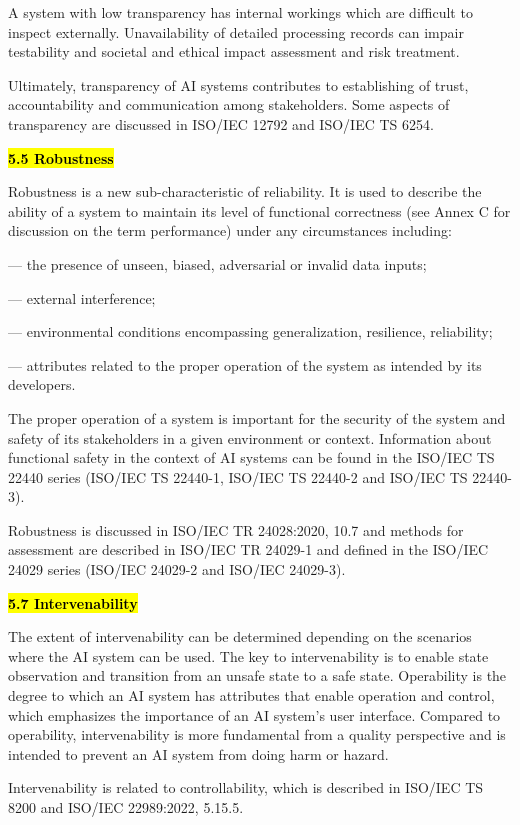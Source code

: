 \documentclass[
  letterpaper,
  DIV=11,
  numbers=noendperiod,
  oneside]{scrreprt}
\begin{document}
\begin{tcolorbox}
A system with low transparency has internal workings which are difficult
to inspect externally. Unavailability of detailed processing records can
impair testability and societal and ethical impact assessment and risk
treatment.

Ultimately, transparency of AI systems contributes to establishing of
trust, accountability and communication among stakeholders. Some aspects
of transparency are discussed in ISO/IEC 12792 and ISO/IEC TS 6254.

\textbf{\hl{5.5 Robustness}}

Robustness is a new sub-characteristic of reliability. It is used to
describe the ability of a system to maintain its level of functional
correctness (see Annex C for discussion on the term performance) under
any circumstances including:

--- the presence of unseen, biased, adversarial or invalid data inputs;

--- external interference;

--- environmental conditions encompassing generalization, resilience,
reliability;

--- attributes related to the proper operation of the system as intended
by its developers.

The proper operation of a system is important for the security of the
system and safety of its stakeholders in a given environment or context.
Information about functional safety in the context of AI systems can be
found in the ISO/IEC TS 22440 series (ISO/IEC TS 22440-1, ISO/IEC TS
22440-2 and ISO/IEC TS 22440-3).

Robustness is discussed in ISO/IEC TR 24028:2020, 10.7 and methods for
assessment are described in ISO/IEC TR 24029-1 and defined in the
ISO/IEC 24029 series (ISO/IEC 24029-2 and ISO/IEC 24029-3).

\textbf{\hl{5.7 Intervenability}}

The extent of intervenability can be determined depending on the
scenarios where the AI system can be used. The key to intervenability is
to enable state observation and transition from an unsafe state to a
safe state. Operability is the degree to which an AI system has
attributes that enable operation and control, which emphasizes the
importance of an AI system's user interface. Compared to operability,
intervenability is more fundamental from a quality perspective and is
intended to prevent an AI system from doing harm or hazard.

Intervenability is related to controllability, which is described in
ISO/IEC TS 8200 and ISO/IEC 22989:2022, 5.15.5.


\end{tcolorbox}
\end{document}
